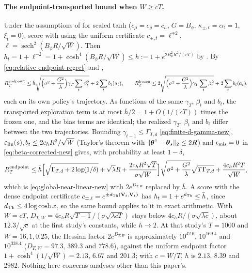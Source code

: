 \paragraph{The endpoint-transported bound when $W\ge cT$.}
Under the assumptions of  for scaled tanh
($c_\mu=c_g=c_h$, $G=B_\phi$, $\kappa_{\pm,t}=\alpha_t=1$, $\xi_t=0$), score with
 using the uniform certificate
$c_{\pm,t}=\ell^{\mp2}$, $\ell=\operatorname{sech}^2(B_\phi R/\sqrt W)$. Then
$h_t=1+\ell^{-2}=1+\cosh^4(B_\phi R/\sqrt W)\le\bar h:=1+e^{2B_\phi^2R^2/(cT)}$
by . By \eqref{eq:relative-endpoint-regret}
and ,
\[
 R_T^{\rm endpoint}\le\bar h\sqrt{\Big(\sigma^2+\frac{G^2}{\lambda}\Big)
 \gamma_T\sum_t\beta_t^2}+2\sum_tb_t(a_t),
 \qquad
 R_T^{\rm frozen}\le2\sqrt{\Big(\sigma^2+\frac{G^2}{\lambda}\Big)
 \gamma_T\sum_t\beta_t^2}+2\sum_tb_t(a_t),
\]
each on its own policy's trajectory. As functions of the same $\gamma_T$,
$\beta_t$ and $b_t$, the transported exploration term is at most
$\bar h/2=1+O(1/(cT))$ times the frozen one, and the bias terms are identical;
the realized $\gamma_T$, $\beta_t$ and $b_t$ differ between the two
trajectories. Bounding $\gamma_{t-1}\le\Gamma_{T,d}$
\eqref{eq:finite-d-gamma-new}, $\varepsilon_{\mathrm{lin}}(s),b_t\le2c_hR^2/\sqrt W$ (Taylor's
theorem with $\|\boldsymbol{\theta}^\circ-\boldsymbol{\theta}_s\|_2\le2R$) and $\epsilon_{\rm mis}=0$ in
\eqref{eq:beta-corrected-new} gives, with probability at least $1-\delta$,
\[
 R_T^{\rm endpoint}\le\bar h\Big[\sqrt{\Gamma_{T,d}+2\log(1/\delta)}
 +\sqrt\lambda R+\frac{2c_hR^2\sqrt T}{\sigma\sqrt W}\Big]
 \sqrt{\sigma^2+\frac{G^2}{\lambda}}\sqrt{T\Gamma_{T,d}}
 +\frac{4c_hR^2T}{\sqrt W},
\]
which is \eqref{eq:global-near-linear-new} with $2e^{D_{T,W}}$ replaced by
$\bar h$. A score with the dense endpoint certificate
$c_{\pm,t}=e^{\pm d_{\rm Th}(\bar{\mathbf{V}}_t,\mathbf{V}_t)}$ has
$h_t=1+e^{d_{\rm Th}}\le\bar h$, since $d_{\rm Th}\le4\log\cosh x$, so the same
bound applies to it in exact arithmetic. With $W=cT$,
$D_{T,W}=4c_hR\sqrt{T-1}/(\sigma\sqrt{\lambda cT})$ stays below
$4c_hR/(\sigma\sqrt{\lambda c})$, about $12.3/\sqrt c$ at the first study's
constants, while $\bar h\to2$. At that study's $T=1000$ and $W=16,1,0.25$, the
Hessian factor $2e^{D_{T,W}}$ is approximately $10^{42.6}$, $10^{169.4}$ and
$10^{338.4}$ ($D_{T,W}=97.3$, $389.3$ and $778.6$), against the uniform
endpoint factor $1+\cosh^4(1/\sqrt W)=2.13$, $6.67$ and $201.3$; with
$c=W/T$, $\bar h$ is $2.13$, $8.39$ and $2982$. Nothing here concerns analyses
other than this paper's.

